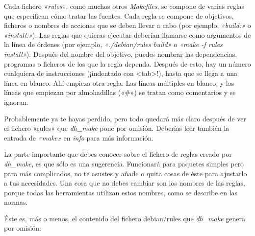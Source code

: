 \documentclass[letterpaper,12pt,spanish]{manual}
\begin{document}
Cada fichero \emph{«rules»}, como muchos otros \emph{Makefiles}, se compone de varias reglas que especifican cómo tratar las fuentes. Cada regla se compone de objetivos, ficheros o nombres de acciones que se deben llevar a cabo (por ejemplo, \emph{«build:»} o \emph{«install:»}). Las reglas que quieras ejecutar deberían llamarse como argumentos de la línea de órdenes (por ejemplo, \emph{«./debian/rules build»} o \emph{«make -f rules install»}). Después del nombre del objetivo, puedes nombrar las dependencias, programas o ficheros de los que la regla dependa. Después de esto, hay un número cualquiera de instrucciones (¡indentado con \textless{}tab\textgreater{}!), hasta que se llega a una línea en blanco. Ahí empieza otra regla. Las líneas múltiples en blanco, y las líneas que empiezan por almohadillas («\#») se tratan como comentarios y se ignoran.

Probablemente ya te hayas perdido, pero todo quedará más claro después de ver el fichero «rules» que \emph{dh\_make} pone por omisión. Deberías leer también la entrada de \emph{«make»} en \emph{info} para más información.

La parte importante que debes conocer sobre el fichero de reglas creado por \emph{dh\_make}, es que sólo es una sugerencia. Funcionará para paquetes simples pero para más complicados, no te asustes y añade o quita cosas de éste para ajustarlo a tus necesidades. Una cosa que no debes cambiar son los nombres de las reglas, porque todas las herramientas utilizan estos nombres, como se describe en las normas.

Éste es, más o menos, el contenido del fichero debian/rules que \emph{dh\_make} genera por omisión:
\end{document}
